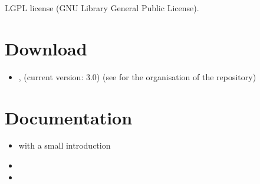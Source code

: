 \documentclass[a4paper,11pt]{article}
\begin{document}
LGPL license (GNU Library General Public License).

\section{Download}

\begin{itemize}
\item {}, (current version: 3.0) (see  for the organisation of the repository)
\end{itemize}

\section{Documentation}
\begin{itemize}
\item {} with a small introduction
\item {}
\item {}
\end{itemize}



\end{document}
